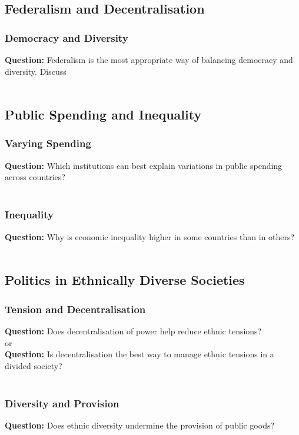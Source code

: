 \documentclass[12pt, letterpaper]{article}
\begin{document}
\subsection{Federalism and Decentralisation}

\subsubsection{Democracy and Diversity}
\textbf{Question:} Federalism is the most appropriate way of balancing democracy and diversity. Discuss
\\\\
\subsection{Public Spending and Inequality}

\subsubsection{Varying Spending}
\textbf{Question:} Which institutions can best explain variations in public spending across countries?
\\\\

\subsubsection{Inequality}
\textbf{Question:} Why is economic inequality higher in some countries than in others?
\\\\



\subsection{Politics in Ethnically Diverse Societies}
\subsubsection{Tension and Decentralisation}
\textbf{Question:} Does decentralisation of power help reduce ethnic tensions?
\\or\\
\textbf{Question:} Is decentralisation the best way to manage ethnic tensions in a divided society?
\\\\

\subsubsection{Diversity and Provision}
\textbf{Question:} Does ethnic diversity undermine the provision of public goods?
\\\\
\end{document}
